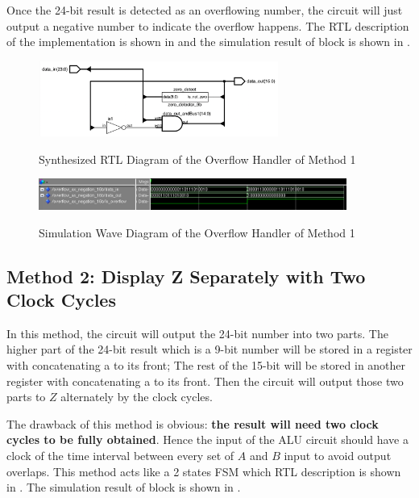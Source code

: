 Once the 24-bit result is detected as an overflowing number,
the circuit will just output a negative number to indicate the overflow happens.
The RTL description of the implementation is shown in  and the simulation result of block is shown in .

\begin{figure}[!ht]
	\centering
	\caption{Synthesized RTL Diagram of the Overflow Handler of Method 1}
	\includegraphics[width=0.7\textwidth]{../img/neg_rtl.png}
	\label{fig:neg_rtl}
\end{figure}

\begin{figure}[!ht]
	\centering
	\caption{Simulation Wave Diagram of the Overflow Handler of Method 1}
	\includegraphics[width=0.9\textwidth]{../img/neg_sim.png}
	\label{fig:neg_sim}
\end{figure}

\subsection{Method 2: Display Z Separately with Two Clock Cycles}

In this method, the circuit will output the 24-bit number into two parts.
The higher part of the 24-bit result which is a 9-bit number
will be stored in a register with concatenating a  to its front;
The rest of the 15-bit will be stored in another register with concatenating a  to its front.
Then the circuit will output those two parts to \(Z\) alternately by the clock cycles.

The drawback of this method is obvious: \textbf{the result will need two clock cycles to be fully obtained}.
Hence the input of the ALU circuit should have a clock of the time interval between every set of \(A\) and \(B\) input
to avoid output overlaps.
This method acts like a 2 states FSM which RTL description is shown in .
The simulation result of block is shown in .


